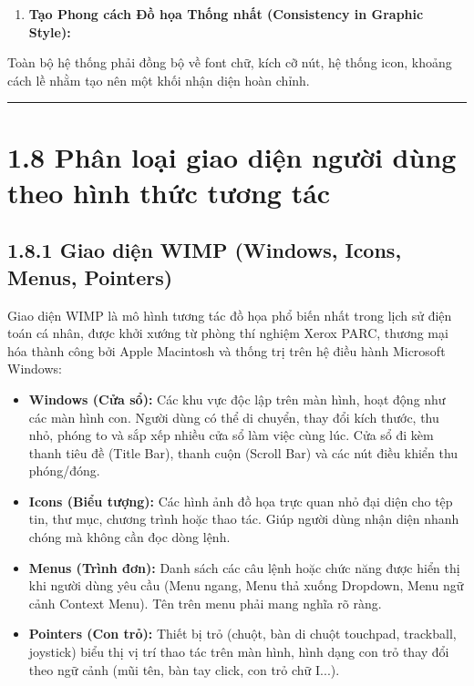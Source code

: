 \documentclass[11pt,a4paper,oneside]{report}
\begin{document}
\begin{enumerate}[leftmargin=1.5em]
\item \textbf{Tạo Phong cách Đồ họa Thống nhất (Consistency in Graphic Style):}  
\end{enumerate}
Toàn bộ hệ thống phải đồng bộ về font chữ, kích cỡ nút, hệ thống icon, khoảng cách lề nhằm tạo nên một khối nhận diện hoàn chỉnh.


\bigskip\hrule\bigskip

\section{1.8 Phân loại giao diện người dùng theo hình thức tương tác}

\subsection{1.8.1 Giao diện WIMP (Windows, Icons, Menus, Pointers)}
Giao diện WIMP là mô hình tương tác đồ họa phổ biến nhất trong lịch sử điện toán cá nhân, được khởi xướng từ phòng thí nghiệm Xerox PARC, thương mại hóa thành công bởi Apple Macintosh và thống trị trên hệ điều hành Microsoft Windows:

\begin{itemize}[leftmargin=1.5em]
\item \textbf{Windows (Cửa sổ):} Các khu vực độc lập trên màn hình, hoạt động như các màn hình con. Người dùng có thể di chuyển, thay đổi kích thước, thu nhỏ, phóng to và sắp xếp nhiều cửa sổ làm việc cùng lúc. Cửa sổ đi kèm thanh tiêu đề (Title Bar), thanh cuộn (Scroll Bar) và các nút điều khiển thu phóng/đóng.
\item \textbf{Icons (Biểu tượng):} Các hình ảnh đồ họa trực quan nhỏ đại diện cho tệp tin, thư mục, chương trình hoặc thao tác. Giúp người dùng nhận diện nhanh chóng mà không cần đọc dòng lệnh.
\item \textbf{Menus (Trình đơn):} Danh sách các câu lệnh hoặc chức năng được hiển thị khi người dùng yêu cầu (Menu ngang, Menu thả xuống Dropdown, Menu ngữ cảnh Context Menu). Tên trên menu phải mang nghĩa rõ ràng.
\item \textbf{Pointers (Con trỏ):} Thiết bị trỏ (chuột, bàn di chuột touchpad, trackball, joystick) biểu thị vị trí thao tác trên màn hình, hình dạng con trỏ thay đổi theo ngữ cảnh (mũi tên, bàn tay click, con trỏ chữ I...).
\end{itemize}
\end{document}
